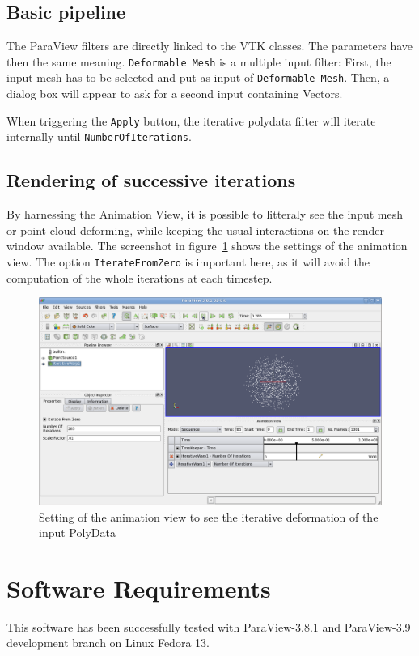\documentclass{InsightArticle}
\begin{document}
\subsection{Basic pipeline}
%
The ParaView filters are directly linked to the VTK classes. The parameters have
then the same meaning. \verb!Deformable Mesh! is a multiple input filter: First,
the input mesh has to be selected and put as input of \verb!Deformable Mesh!.
Then, a dialog box will appear to ask for a second input containing Vectors.

When triggering the \verb!Apply! button, the iterative polydata filter will 
iterate internally until \verb!NumberOfIterations!.
%
\subsection{Rendering of successive iterations}
%
By harnessing the Animation View, it is possible to litteraly see the input mesh
or point cloud deforming, while keeping the usual interactions on the render 
window available. The screenshot in figure~\ref{fig:animation-view} shows the
settings of the animation view. The option \verb!IterateFromZero! is important
here, as it will avoid the computation of the whole iterations at each 
timestep.
%
\begin{figure}
 \includegraphics[width=\textwidth]{./Figures/animation-view}
\caption{Setting of the animation view to see the iterative deformation of the 
input PolyData}
\label{fig:animation-view}
\end{figure}
%
\section{Software Requirements}
%
This software has been successfully tested with ParaView-3.8.1 and ParaView-3.9
development branch on Linux Fedora 13.
%
\end{document}
